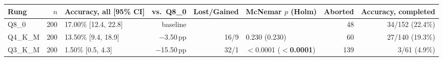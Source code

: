 \begin{tabular}{@{}lrlrrlrr@{}}
\toprule
Rung & $n$ & Accuracy, all [95\% CI] & vs.\ Q8\_0 & Lost/Gained & McNemar $p$ (Holm) & Aborted & Accuracy, completed \\
\midrule
Q8\_0 & 200 & 17.00\% [12.4, 22.8] & baseline & & & 48 & 34/152 (22.4\%) \\
Q4\_K\_M & 200 & 13.50\% [9.4, 18.9] & $-$3.50\,pp & 16/9 & 0.230 (0.230) & 60 & 27/140 (19.3\%) \\
Q3\_K\_M & 200 & 1.50\% [0.5, 4.3] & $-$15.50\,pp & 32/1 & $<$0.0001 (\textbf{$<$0.0001}) & 139 & 3/61 (4.9\%) \\
\bottomrule
\end{tabular}
